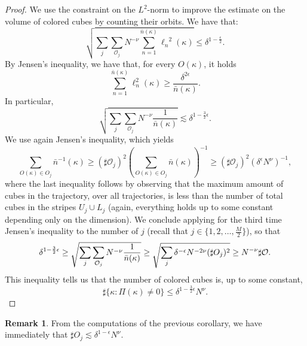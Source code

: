\documentclass[12 pt]{article}
\theoremstyle{definition} \newtheorem{definition}{Definition}[section]
\theoremstyle{definition} \newtheorem{remark}[definition]{Remark}
\theoremstyle{plain} \newtheorem{lemma}[definition]{Lemma}
\theoremstyle{plain} \newtheorem{proposition}[definition]{Proposition}
\theoremstyle{plain} \newtheorem{theorem}[definition]{Theorem}
\theoremstyle{plain} \newtheorem{corollary}[definition]{Corollary}
\theoremstyle{definition} \newtheorem{example}[definition]{Example}
\theoremstyle{definition} \newtheorem{assumption}[definition]{Assumption}
\theoremstyle{definition} \newtheorem{conjecture}[definition]{Conjecture}
\newcommand{\1}{\mathbbm 1}
\numberwithin{equation}{section}
\begin{document}
\begin{proof}
       We use the constraint on the $L^2$-norm to improve the estimate on the volume of colored cubes by counting their orbits. We have that:
       \begin{equation*}
           \sqrt{\sum_j \sum_{\mathcal O_j} N^{-\nu}\sum_{n=1}^{\bar n(\kappa)}{\ell_n}^2(\kappa)}\leq \delta^{1-\frac{\epsilon}{2}}.
       \end{equation*}
       By Jensen's inequality, we have that, for every $O(\kappa)$, it holds 
       \begin{equation*}
           \sum_{n=1}^{\bar n(\kappa)} \ell_n^2(\kappa)\geq \frac{\delta^{2\epsilon}}{\bar n(\kappa)}.
       \end{equation*}
       In particular, 
       \begin{equation*}
            \sqrt{\sum_j \sum_{\mathcal O_j} N^{-\nu}\frac{1}{\bar n(\kappa)}}\lesssim \delta^{1-\frac{3}{2}\epsilon}.
       \end{equation*}
       We use again Jensen's inequality, which yields
       \begin{equation*}
           \sum_{O(\kappa)\in O_j} \bar n^{-1}(\kappa)\geq (\sharp\mathcal{O}_j)^2\left(\sum_{O(\kappa)\in O_j} \bar n(\kappa)\right)^{-1}\geq (\sharp\mathcal{O}_j)^2(\delta^\epsilon N^\nu)^{-1},
       \end{equation*}
       where the last inequality follows by observing that the maximum amount of cubes in the trajectory, over all trajectories, is less than the number of total cubes in the stripes $U_j\cup L_j$ (again, everything holds up to some constant depending only on the dimension). We conclude applying for the third time Jensen's inequality to the number of $j$ (recall that $j\in\lbrace 1,2,\dots,\frac{M}{2}\rbrace$), so that
       \begin{equation}\label{eq:questa}
          \delta^{1-\frac{3}{2}\epsilon}\geq \sqrt{\sum_j \sum_{\mathcal O_j} N^{-\nu}\frac{1}{\bar n(\kappa)}}\geq \sqrt{\sum_{j} \delta^{-\epsilon}N^{-2\nu}(\sharp\mathcal \mathcal{O}_j)^2}\geq N^{-\nu}\sharp \mathcal O.
       \end{equation}
       This inequality tells us that the number of colored cubes is, up to some constant, 
       \begin{equation*}
           \sharp\lbrace \kappa:\Pi(\kappa)\not=0\rbrace\leq \delta^{1-\frac{3}{2}\epsilon}N^{\nu}.
       \end{equation*}
       \end{proof}
       \begin{remark}\label{rmk:estimate:O:j}
       From the computations of the previous corollary, we have immediately that $\sharp O_j\lesssim \delta^{1-\epsilon}N^\nu$.
       \end{remark}
\end{document}
